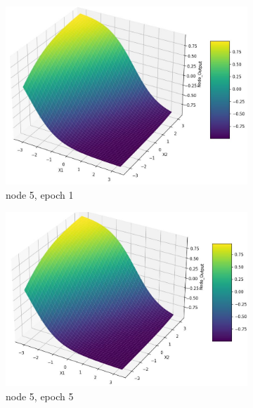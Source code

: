 \documentclass[11pt]{article}
\begin{document}
\newpage
\begin{figure}[h!]
\centering
	\begin{subfigure}[b]{0.3\textwidth}
	\centering
	\includegraphics[scale=0.14]{hidden1_n5_e1.jpg}
	\caption{node 5, epoch 1}
	\label{fig:fig2.1.5.1}
	\end{subfigure}
	\begin{subfigure}[b]{0.3\textwidth}
	\centering
	\includegraphics[scale=0.14]{hidden1_n5_e5.jpg}
	\caption{node 5, epoch 5}
	\label{fig:fig2.1.5.2}
	\end{subfigure}
	\begin{subfigure}[b]{0.3\textwidth}
	\centering

\end{subfigure}
\end{figure}
\end{document}
